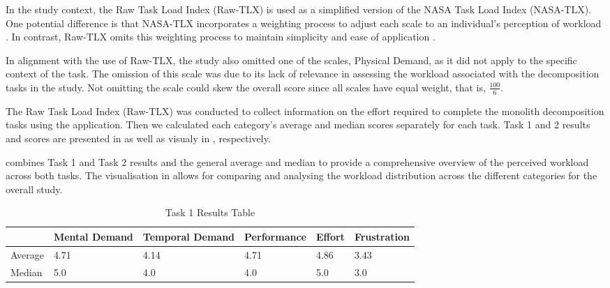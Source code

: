 In the study context, the Raw Task Load Index (Raw-TLX) is used as a simplified
version of the NASA Task Load Index (NASA-TLX). One potential difference is
that NASA-TLX incorporates a weighting process to adjust each scale to an
individual's perception of workload \cite{hart1988development}. In contrast,
Raw-TLX omits this weighting process to maintain simplicity and ease of
application \cite{hart2006nasa}.

In alignment with the use of Raw-TLX, the study also omitted one of the scales,
Physical Demand, as it did not apply to the specific context of the task. The
omission of this scale was due to its lack of relevance in assessing the
workload associated with the decomposition tasks in the study. Not omitting the
scale could skew the overall score since all scales have equal weight, that is,
\( \frac{100}{6} \).

The Raw Task Load Index (Raw-TLX) was conducted to collect information on the
effort required to complete the monolith decomposition tasks using the
application. Then we calculated each category's average and median scores
separately for each task. Task 1 and 2 results and scores are presented in
 as well as visualy in
, respectively.

 combines Task 1 and Task 2 results and the general
average and median to provide a comprehensive overview of the perceived
workload across both tasks. The visualisation in 
allows for comparing and analysing the workload distribution across the
different categories for the overall study.

\begin{table}[!htb] \caption{Task 1 Results Table} \label{tab:separated_task_1}
  \begin{center}
    \begin{tabular}[c]{p{4em}|p{4em}|p{4em}|p{4em}|p{4em}|p{4em}}
      \textbf{} &
      \textbf{Mental Demand} &
      \textbf{Temporal Demand} &
      \textbf{Perfor\-mance} &
      \textbf{Effort} &
      \textbf{Frustration} \\
      \hline Average & 4.71 & 4.14 & 4.71 & 4.86 & 3.43 \\
      \hline Median & 5.0 & 4.0 & 4.0 & 5.0 & 3.0 \\
    \end{tabular}
  \end{center}
\end{table}

